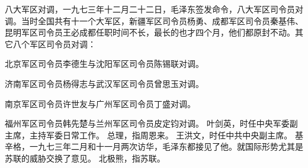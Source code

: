 \begin{maonote}
八大军区对调，一九七三年十二月二十二日，毛泽东签发命令，八大军区司令员对调。当时全国共有十一个大军区，新疆军区司令员杨勇、成都军区司令员秦基伟、昆明军区司令员王必成都任职时间不长，最长的也才四个月，他们都原封不动。其它八个军区司令员对调：

北京军区司令员李德生与沈阳军区司令员陈锡联对调。

济南军区司令员杨得志与武汉军区司令员曾思玉对调。

南京军区司令员许世友与广州军区司令员丁盛对调。

福州军区司令员韩先楚与兰州军区司令员皮定钧对调。
叶剑英，时任中央军委副主席，主持军委日常工作。
总理，指周恩来。
王洪文，时任中共中央副主席。
基辛格，一九七三年二月和十一月两次访华，毛泽东都接见了他。就国际形势尤其是苏联的威胁交换了意见。
北极熊，指苏联。
\end{maonote}
